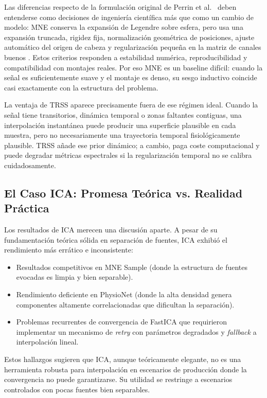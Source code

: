 Las diferencias respecto de la formulación original de Perrin et al.~\cite{perrin1989} deben entenderse como decisiones de ingeniería científica más que como un cambio de modelo: MNE conserva la expansión de Legendre sobre esfera, pero usa una expansión truncada, rigidez fija, normalización geométrica de posiciones, ajuste automático del origen de cabeza y regularización pequeña en la matriz de canales buenos \cite{gramfort2013meg, gramfort_mne_software_2014, mne_interpolate_bads_docs}. Estos criterios responden a estabilidad numérica, reproducibilidad y compatibilidad con montajes reales. Por eso MNE es un baseline difícil: cuando la señal es suficientemente suave y el montaje es denso, su sesgo inductivo coincide casi exactamente con la estructura del problema.

La ventaja de TRSS aparece precisamente fuera de ese régimen ideal. Cuando la señal tiene transitorios, dinámica temporal o zonas faltantes contiguas, una interpolación instantánea puede producir una superficie plausible en cada muestra, pero no necesariamente una trayectoria temporal fisiológicamente plausible. TRSS añade ese prior dinámico; a cambio, paga coste computacional y puede degradar métricas espectrales si la regularización temporal no se calibra cuidadosamente.

\subsection{El Caso ICA: Promesa Teórica vs. Realidad Práctica}

Los resultados de ICA merecen una discusión aparte. A pesar de su fundamentación teórica sólida en separación de fuentes, ICA exhibió el rendimiento más errático e inconsistente:
\begin{itemize}
    \item Resultados competitivos en MNE Sample (donde la estructura de fuentes evocadas es limpia y bien separable).
    \item Rendimiento deficiente en PhysioNet (donde la alta densidad genera componentes altamente correlacionadas que dificultan la separación).
    \item Problemas recurrentes de convergencia de FastICA que requirieron implementar un mecanismo de \textit{retry} con parámetros degradados y \textit{fallback} a interpolación lineal.
\end{itemize}

Estos hallazgos sugieren que ICA, aunque teóricamente elegante, no es una herramienta robusta para interpolación en escenarios de producción donde la convergencia no puede garantizarse. Su utilidad se restringe a escenarios controlados con pocas fuentes bien separables.


